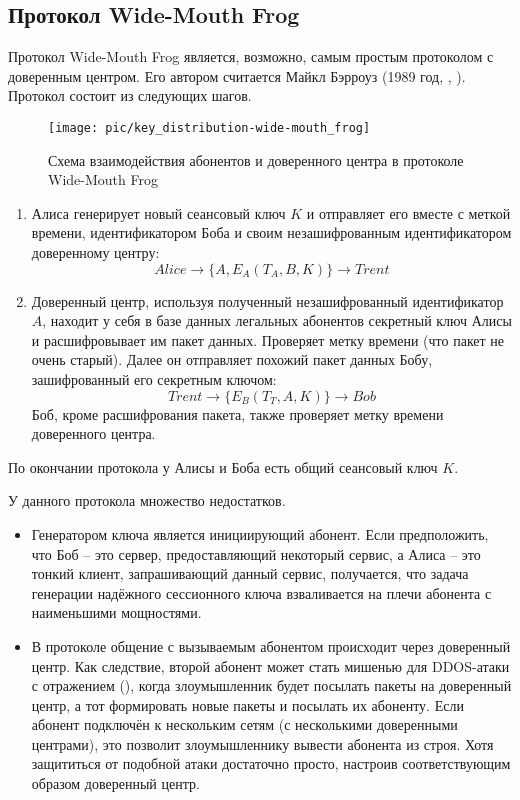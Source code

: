 \subsection{Протокол Wide-Mouth Frog}\label{section-protocols-wide-moth-frog}
Протокол Wide-Mouth Frog является, возможно, самым простым протоколом с доверенным центром. Его автором считается Майкл Бэрроуз (1989 год, ,  \cite{Burrows:Abadi:Needham:1990}). Протокол состоит из следующих шагов.

\begin{figure}[!htb]
    \centering
    \texttt{[image: pic/key\_distribution-wide-mouth\_frog]}
    \caption{Схема взаимодействия абонентов и доверенного центра в протоколе Wide-Mouth Frog\label{fig:key_distribution-wide-mouth_frog}}
\end{figure}

\begin{enumerate}
	\item Алиса генерирует новый сеансовый ключ $K$ и отправляет его вместе с меткой времени, идентификатором Боба и своим незашифрованным идентификатором доверенному центру:
	\[ Alice \rightarrow \{ A, E_A \left( T_A, B, K \right) \} \rightarrow Trent \]
	\item Доверенный центр, используя полученный незашифрованный идентификатор $A$, находит у себя в базе данных легальных абонентов секретный ключ Алисы и расшифровывает им пакет данных. Проверяет метку времени (что пакет не очень старый). Далее он отправляет похожий пакет данных Бобу, зашифрованный его секретным ключом:
	\[ Trent \rightarrow \{ E_B \left( T_T, A, K \right) \} \rightarrow Bob \]
	Боб, кроме расшифрования пакета, также проверяет метку времени доверенного центра.
\end{enumerate}

По окончании протокола у Алисы и Боба есть общий сеансовый ключ $K$.

У данного протокола множество недостатков.

\begin{itemize}
	\item Генератором ключа является инициирующий абонент. Если предположить, что Боб -- это сервер, предоставляющий некоторый сервис, а Алиса -- это тонкий клиент, запрашивающий данный сервис, получается, что задача генерации надёжного сессионного ключа взваливается на плечи абонента с наименьшими мощностями.
	\item В протоколе общение с вызываемым абонентом происходит через доверенный центр. Как следствие, второй абонент может стать мишенью для DDOS-атаки с отражением (), когда злоумышленник будет посылать пакеты на доверенный центр, а тот формировать новые пакеты и посылать их абоненту. Если абонент подключён к нескольким сетям (с несколькими доверенными центрами), это позволит злоумышленнику вывести абонента из строя. Хотя защититься от подобной атаки достаточно просто, настроив соответствующим образом доверенный центр.
\end{itemize}

